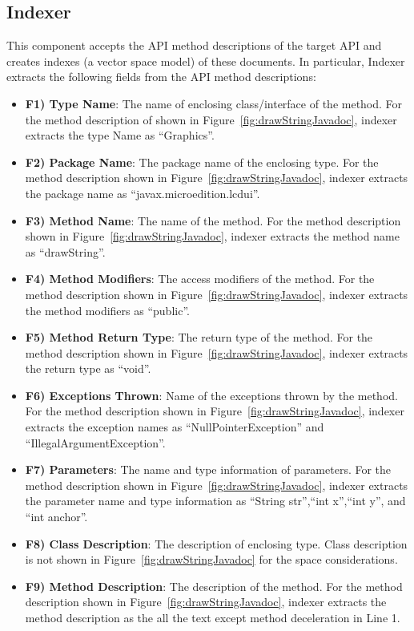 \subsection{Indexer}
\label{sub:Approach_Indexer}

This component accepts the API method descriptions of the target API
and creates indexes (a vector space model) of these documents.
In particular, Indexer extracts the following fields from the API method descriptions:

\begin{itemize} 
	\item \textbf{F1) Type Name}: The name of enclosing class/interface of the method. For the method description of  shown in Figure~\ref{fig:drawStringJavadoc}, indexer extracts the type Name as ``Graphics''.
	
	\item \textbf{F2) Package Name}: The package name of the enclosing type. For the method description shown in Figure~\ref{fig:drawStringJavadoc}, indexer extracts the package name as ``javax.microedition.lcdui''.
	
	\item \textbf{F3) Method Name}: The name of the method. For the method description shown in Figure~\ref{fig:drawStringJavadoc}, indexer extracts the method name as ``drawString''.
	
	\item \textbf{F4) Method Modifiers}: The access modifiers of the method. For the method description shown in Figure~\ref{fig:drawStringJavadoc}, indexer extracts the method modifiers as ``public''.
	
	\item \textbf{F5) Method Return Type}: The return type of the method. For the method description shown in Figure~\ref{fig:drawStringJavadoc}, indexer extracts the return type as ``void''.
	
	\item \textbf{F6) Exceptions Thrown}: Name of the exceptions thrown by the method. For the method description shown in Figure~\ref{fig:drawStringJavadoc}, indexer extracts the exception names as ``NullPointerException'' and ``IllegalArgumentException''.
	
	\item \textbf{F7) Parameters}: The name and type information of parameters. For the method description shown in Figure~\ref{fig:drawStringJavadoc}, indexer extracts the parameter name and type information as ``String str'',``int x'',``int y'', and ``int anchor''.
	
	\item \textbf{F8) Class Description}: The description of enclosing type. Class description is not shown in Figure~\ref{fig:drawStringJavadoc} for the space considerations.
	
	\item \textbf{F9) Method Description}: The description of the method. For the method description shown in Figure~\ref{fig:drawStringJavadoc}, indexer extracts the method description as the all the text except method deceleration in Line 1.
			 
\end{itemize}

